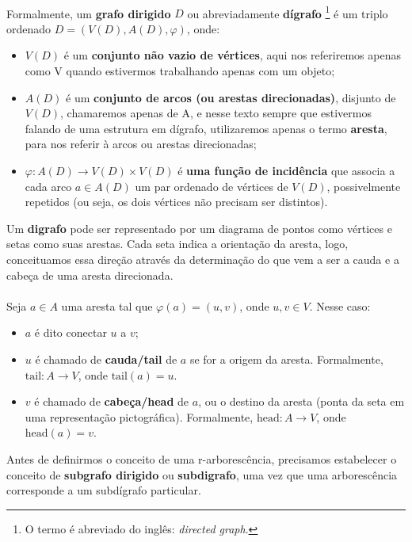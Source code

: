 \documentclass[12pt,a4paper]{article}
\begin{document}
\paragraph{}
Formalmente, um \textbf{grafo dirigido} \(D\) ou abreviadamente \textbf{dígrafo} 
\footnote{O termo é abreviado do inglês: \textit{directed graph}.} é um triplo ordenado \(D = (V(D), A(D), \varphi)\), onde:
\begin{itemize}
    \item \(V(D)\) é um \textbf{conjunto não vazio de vértices}, aqui nos referiremos apenas como V quando estivermos trabalhando apenas com um objeto;
    \item \(A(D)\) é um \textbf{conjunto de arcos (ou arestas direcionadas)}, disjunto de \(V(D)\), chamaremos apenas de A, e nesse texto sempre que estivermos falando de uma estrutura em dígrafo, utilizaremos apenas o termo \textbf{aresta}, para nos referir à arcos ou arestas direcionadas;
    \item \(\varphi: A(D) \to V(D) \times V(D)\) é \textbf{uma função de incidência} que associa a cada arco \(a \in A(D)\) um par ordenado de vértices de \(V(D)\), possivelmente repetidos (ou seja, os dois vértices não precisam ser distintos).
\end{itemize}

Um \textbf{digrafo} pode ser representado por um diagrama de pontos como vértices e setas como suas arestas. Cada seta indica a orientação da aresta, logo, conceituamos essa direção através da determinação do que vem a ser a cauda e a cabeça de uma aresta direcionada.

\paragraph{}
Seja \(a \in A\) uma aresta tal que \(\varphi(a) = (u, v)\), onde \(u, v \in V\). Nesse caso:
\begin{itemize}
    \item \(a\) é dito conectar \(u\) a \(v\);
    \item \(u\) é chamado de \textbf{cauda/tail} de \(a\) se for a origem da aresta. Formalmente, \(\text{tail}: A \to V\), onde \(\text{tail}(a) = u\).
    \item \(v\) é chamado de \textbf{cabeça/head} de \(a\), ou o destino da aresta (ponta da seta em uma representação pictográfica). Formalmente, \(\text{head}: A \to V\), onde \(\text{head}(a) = v\).
\end{itemize}

Antes de definirmos o conceito de uma r-arborescência, precisamos estabelecer o conceito de \textbf{subgrafo dirigido} ou \textbf{subdigrafo}, uma vez que uma arborescência corresponde a um subdígrafo particular.
\end{document}
